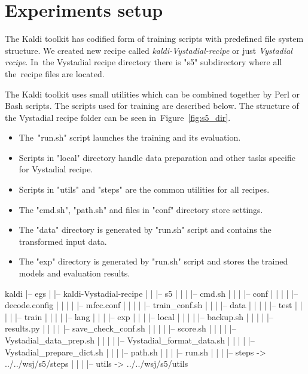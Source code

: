 \chapter{Experiments setup} 
\label{cha:setup}

\small{The Kaldi toolkit has codified form of training scripts with predefined file system structure. 
We created new recipe called {\it kaldi-Vystadial-recipe}\/ or just {\it Vystadial recipe}. 
In~the Vystadial recipe directory there is "s5" subdirectory where all the~recipe files are located. 

The Kaldi toolkit uses small utilities which can be combined together by Perl or Bash scripts.
The scripts used for training are described below. 
The structure of the Vystadial recipe folder can be seen in~Figure~\ref{fig:s5_dir}.
\begin{itemize}
    \item The~"run.sh" script launches the training and its evaluation.
    \item Scripts in "local" directory handle data preparation and other tasks specific for Vystadial recipe.
    \item Scripts in "utils" and "steps" are the common utilities for all recipes. 
    \item The "cmd.sh", "path.sh" and files in "conf" directory store settings.
    \item The "data" directory is generated by "run.sh" script and contains the transformed input data.
    \item The "exp" directory is generated by "run.sh" script and stores the trained models and evaluation results.
\end{itemize}

\tiny\begin{verbbox}
kaldi
|-- egs
|   |-- kaldi-Vystadial-recipe
|   |   |-- s5
|   |   |   |-- cmd.sh
|   |   |   |-- conf
|   |   |   |   |-- decode.config
|   |   |   |   |-- mfcc.conf
|   |   |   |   |-- train_conf.sh
|   |   |   |-- data
|   |   |   |   |-- test 
|   |   |   |   |-- train
|   |   |   |   |-- lang
|   |   |   |-- exp
|   |   |   |-- local
|   |   |   |   |-- backup.sh
|   |   |   |   |-- results.py
|   |   |   |   |-- save_check_conf.sh
|   |   |   |   |-- score.sh
|   |   |   |   |-- Vystadial_data_prep.sh
|   |   |   |   |-- Vystadial_format_data.sh
|   |   |   |   |-- Vystadial_prepare_dict.sh
|   |   |   |-- path.sh
|   |   |   |-- run.sh
|   |   |   |-- steps -> ../../wsj/s5/steps
|   |   |   |-- utils -> ../../wsj/s5/utils
\end{verbbox}
\normalsize

}
